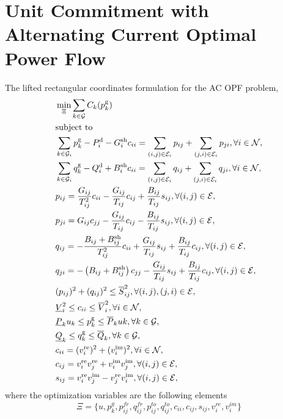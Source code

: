 \documentclass[11pt,twoside]{article}
\begin{document}
\section{Unit Commitment with Alternating Current Optimal Power Flow}
The lifted rectangular coordinates formulation for the AC OPF problem,
\begin{subequations}
	\begin{align}
		& \min_{\Xi} \sum_{k \in \mathcal{G}} C_k(p_k^{\text{g}}) \\
		& \text{subject to} \notag \\
		& \sum_{k \in \mathcal{G}_i} p_k^{\text{g}} - P_i^{\text{d}} - G_i^{\text{sh}} c_{ii} = \sum_{(i,j) \in \mathcal{E}_i} p_{ij} + \sum_{(j,i) \in \mathcal{E}_i} p_{ji}, \forall i \in \mathcal{N},  \\
		& \sum_{k \in \mathcal{G}_i} q_k^{\text{g}} - Q_i^{\text{d}} + B_i^{\text{sh}} c_{ii} = \sum_{(i,j) \in \mathcal{E}_i} q_{ij} + \sum_{(j,i) \in \mathcal{E}_i} q_{ji}, \forall i \in \mathcal{N},  \\
		& p_{ij} = \frac{G_{ij}}{T_{ij}^2} c_{ii} - \frac{G_{ij}}{T_{ij}} c_{ij} + \frac{B_{ij}}{T_{ij}} s_{ij}, \forall (i, j) \in \mathcal{E},  \\
		& p_{ji} = G_{ij} c_{jj} - \frac{G_{ij}}{T_{ij}} c_{ij} - \frac{B_{ij}}{T_{ij}} s_{ij}, \forall (i, j) \in \mathcal{E},  \\
		& q_{ij} = -\frac{B_{ij} + B_{ij}^{\text{sh}}}{T_{ij}^2} c_{ii} + \frac{G_{ij}}{T_{ij}} s_{ij} + \frac{B_{ij}}{T_{ij}} c_{ij}, \forall (i, j) \in \mathcal{E},  \\
		& q_{ji} = -\left( B_{ij} + B_{ij}^{\text{sh}} \right) c_{jj} - \frac{G_{ij}}{T_{ij}} s_{ij} + \frac{B_{ij}}{T_{ij}} c_{ij}, \forall (i, j) \in \mathcal{E}, \\
		& (p_{ij})^2 + (q_{ij})^2 \leq \overline{S}_{ij}^2, \forall (i, j), (j, i) \in \mathcal{E},  \\
		& \underline{V}_i^2 \leq c_{ii} \leq \overline{V}_i^2, \forall i \in \mathcal{N},  \\
		& \underline{P}_k u_k \leq p_k^{\text{g}} \leq \overline{P}_k uk, \forall k \in \mathcal{G},  \\
		& \underline{Q}_k \leq q_k^{\text{g}} \leq \overline{Q}_k, \forall k \in \mathcal{G},  \\
		& c_{ii} = (v_i^{\text{re}})^2 + (v_i^{\text{im}})^2, \forall i \in \mathcal{N},  \\
		& c_{ij} = v_i^{\text{re}} v_j^{\text{re}} + v_i^{\text{im}} v_j^{\text{im}}, \forall (i, j) \in \mathcal{E},  \\
		& s_{ij} = v_i^{\text{re}} v_j^{\text{im}} - v_j^{\text{re}} v_i^{\text{im}}, \forall (i, j) \in \mathcal{E}, 
	\end{align}
\end{subequations}
where the optimization variables are the following elements
$$\Xi = \{ u, p^g_k, p_{ij}^{fr}, q_{ij}^{fr}, p_{ij}^{to}, q_{ij}^{to}, c_{ii}, c_{ij}, s_{ij}, v_i^{re}, v_i^{im} \}$$
\end{document}
